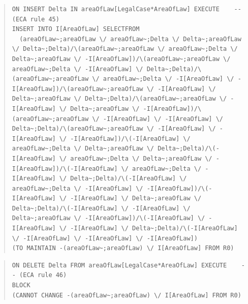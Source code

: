 \documentclass[10pt,a4paper]{report}              %
\theoremstyle{plain}\theorembodyfont{\rmfamily}\newtheorem{definition}{Definition}[section]
\theoremstyle{plain}\theorembodyfont{\rmfamily}\newtheorem{designrule}[definition]{Requirement}
\begin{document}
\begin{quote}
\begin{verbatim}
ON INSERT Delta IN areaOfLaw[LegalCase*AreaOfLaw] EXECUTE    -- (ECA rule 45)
INSERT INTO I[AreaOfLaw] SELECTFROM
  (areaOfLaw~;areaOfLaw \/ areaOfLaw~;Delta \/ Delta~;areaOfLaw \/ Delta~;Delta)/\(areaOfLaw~;areaOfLaw \/ areaOfLaw~;Delta \/ Delta~;areaOfLaw \/ -I[AreaOfLaw])/\(areaOfLaw~;areaOfLaw \/ areaOfLaw~;Delta \/ -I[AreaOfLaw] \/ Delta~;Delta)/\(areaOfLaw~;areaOfLaw \/ areaOfLaw~;Delta \/ -I[AreaOfLaw] \/ -I[AreaOfLaw])/\(areaOfLaw~;areaOfLaw \/ -I[AreaOfLaw] \/ Delta~;areaOfLaw \/ Delta~;Delta)/\(areaOfLaw~;areaOfLaw \/ -I[AreaOfLaw] \/ Delta~;areaOfLaw \/ -I[AreaOfLaw])/\(areaOfLaw~;areaOfLaw \/ -I[AreaOfLaw] \/ -I[AreaOfLaw] \/ Delta~;Delta)/\(areaOfLaw~;areaOfLaw \/ -I[AreaOfLaw] \/ -I[AreaOfLaw] \/ -I[AreaOfLaw])/\(-I[AreaOfLaw] \/ areaOfLaw~;Delta \/ Delta~;areaOfLaw \/ Delta~;Delta)/\(-I[AreaOfLaw] \/ areaOfLaw~;Delta \/ Delta~;areaOfLaw \/ -I[AreaOfLaw])/\(-I[AreaOfLaw] \/ areaOfLaw~;Delta \/ -I[AreaOfLaw] \/ Delta~;Delta)/\(-I[AreaOfLaw] \/ areaOfLaw~;Delta \/ -I[AreaOfLaw] \/ -I[AreaOfLaw])/\(-I[AreaOfLaw] \/ -I[AreaOfLaw] \/ Delta~;areaOfLaw \/ Delta~;Delta)/\(-I[AreaOfLaw] \/ -I[AreaOfLaw] \/ Delta~;areaOfLaw \/ -I[AreaOfLaw])/\(-I[AreaOfLaw] \/ -I[AreaOfLaw] \/ -I[AreaOfLaw] \/ Delta~;Delta)/\(-I[AreaOfLaw] \/ -I[AreaOfLaw] \/ -I[AreaOfLaw] \/ -I[AreaOfLaw])
(TO MAINTAIN -(areaOfLaw~;areaOfLaw) \/ I[AreaOfLaw] FROM R0)
\end{verbatim}
\end{quote}
\begin{quote}
\begin{verbatim}
ON DELETE Delta FROM areaOfLaw[LegalCase*AreaOfLaw] EXECUTE    -- (ECA rule 46)
BLOCK
(CANNOT CHANGE -(areaOfLaw~;areaOfLaw) \/ I[AreaOfLaw] FROM R0)
\end{verbatim}
\end{quote}
\end{document}
